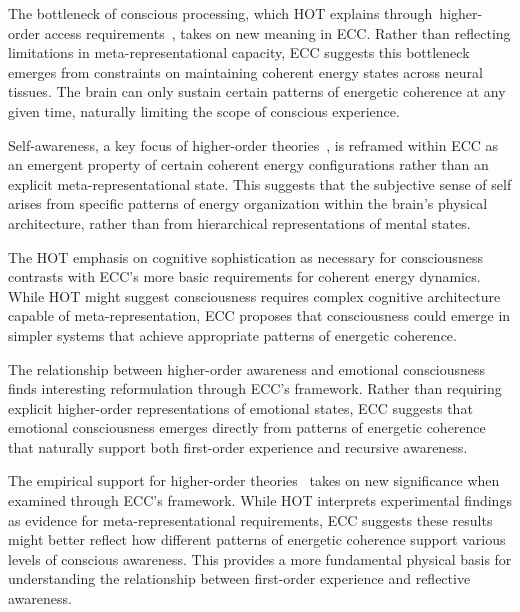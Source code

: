 The bottleneck of conscious processing, which HOT explains through~higher-order access requirements~\cite{Lau2011, Rosenthal2019}, takes on new meaning in ECC. Rather than reflecting limitations in meta-representational capacity, ECC suggests this bottleneck emerges from constraints on maintaining coherent energy states across neural tissues. The brain can only sustain certain patterns of energetic coherence at any given time, naturally limiting the scope of conscious experience.

Self-awareness, a key focus of higher-order theories~\cite{Kriegel2009, Gennaro2012}, is reframed within ECC as an emergent property of certain coherent energy configurations rather than an explicit meta-representational state. This suggests that the subjective sense of self arises from specific patterns of energy organization within the brain's physical architecture, rather than from hierarchical representations of mental states.

The HOT emphasis on cognitive sophistication as necessary for consciousness~\cite{Brown2019, Lau2011} contrasts with ECC's more basic requirements for coherent energy dynamics. While HOT might suggest consciousness requires complex cognitive architecture capable of meta-representation, ECC proposes that consciousness could emerge in simpler systems that achieve appropriate patterns of energetic coherence.

The relationship between higher-order awareness and emotional consciousness~\cite{LeDoux2017, Brown2019} finds interesting reformulation through ECC's framework. Rather than requiring explicit higher-order representations of emotional states, ECC suggests that emotional consciousness emerges directly from patterns of energetic coherence that naturally support both first-order experience and recursive awareness.

The empirical support for higher-order theories~\cite{Lau2011, Rosenthal2019} takes on new significance when examined through ECC's framework. While HOT interprets experimental findings as evidence for meta-representational requirements, ECC suggests these results might better reflect how different patterns of energetic coherence support various levels of conscious awareness. This provides a more fundamental physical basis for understanding the relationship between first-order experience and reflective awareness.

